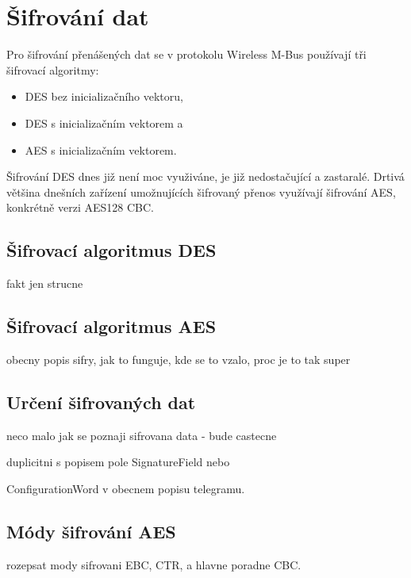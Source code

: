 
\section{Šifrování dat}

Pro šifrování přenášených dat se v protokolu Wireless M-Bus používají tři šifrovací algoritmy:
\begin{itemize}
	\item DES bez inicializačního vektoru,
	\item DES s inicializačním vektorem a
	\item AES s inicializačním vektorem.
\end{itemize}

Šifrování DES dnes již není moc využiváne, je již nedostačující a zastaralé. Drtivá většina dnešních zařízení umožnujících šifrovaný přenos využívají šifrování AES, konkrétně verzi AES128 CBC.

\subsection{Šifrovací algoritmus DES}
\colorbox[rgb]{0,1,0}{fakt jen strucne}

\subsection{Šifrovací algoritmus AES}
\colorbox[rgb]{0,1,0}{obecny popis sifry, jak to funguje, kde se to vzalo, proc je to tak super}


\subsection{Určení šifrovaných dat}
\colorbox[rgb]{0,1,0}{neco malo jak se poznaji sifrovana data - bude castecne }

\colorbox[rgb]{0,1,0}{duplicitni s popisem pole SignatureField nebo }

\colorbox[rgb]{0,1,0}{ConfigurationWord v obecnem popisu telegramu.}


\subsection{Módy šifrování AES}
\colorbox[rgb]{0,1,0}{rozepsat mody sifrovani EBC, CTR, a hlavne poradne CBC.}

